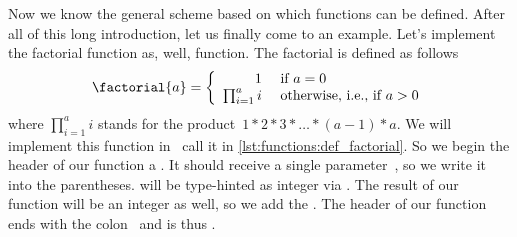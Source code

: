 %
%
%
%
%
%
Now we know the general scheme based on which functions can be defined.
After all of this long introduction, let us finally come to an example.
Let's implement the factorial function as, well, function.
The factorial is defined as follows%
%
\begin{equation}%
\factorial{a}=\left\{\begin{array}{rl}%
1&\textnormal{~if~}a = 0\\%
\prod_{i=1}^a i&\textnormal{~otherwise, i.e., if~}a>0%
\end{array}\right.%
\label{eq:factorial}%
\end{equation}%
%
where $\prod_{i=1}^a i$ stands for the product~$1*2*3*\dots*(a-1)*a$.
We will implement this function in \python\ call it  in \cref{lst:functions:def_factorial}.
So we begin the header of our function a .
It should receive a single parameter~, so we write it into the parentheses.
 will be type-hinted as integer via .
The result of our function will be an integer as well, so we add the  .
The header of our function ends with the colon~\pythonil{:} and is thus .


